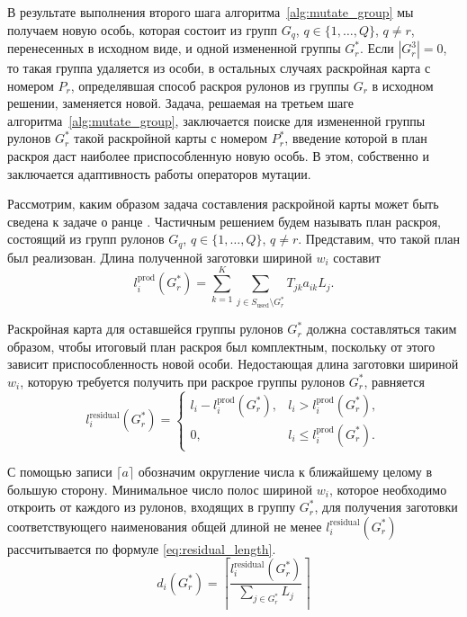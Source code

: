 \documentclass[12pt]{article}
\begin{document}
В результате выполнения второго шага алгоритма~\ref{alg:mutate_group} 
мы получаем новую 
особь, которая состоит из групп $G_q$, $q \in \{1,\ldots,Q\}$, $q \neq r$, 
перенесенных в исходном виде, и одной измененной группы $G_r^*$. Если 
$|G_r^3|=0$, то такая группа удаляется из особи, в остальных случаях 
раскройная карта с номером $P_r$, определявшая способ раскроя рулонов из 
группы $G_r$ в исходном решении, заменяется новой. Задача, решаемая на третьем 
шаге алгоритма~\ref{alg:mutate_group}, заключается поиске для измененной 
группы рулонов $G_r^*$ такой 
раскройной карты с номером $P_r^*$, введение которой в план раскроя даст 
наиболее приспособленную новую особь. В этом, собственно и заключается 
адаптивность работы операторов мутации.

Рассмотрим, каким образом задача составления раскройной карты может быть 
сведена к задаче о ранце 
\cite{martello90}. 
Частичным решением будем называть план 
раскроя, состоящий из групп рулонов $G_q$, $q \in \{1,\ldots,Q\}$, $q \neq r$. 
Представим, что такой план был реализован. Длина полученной заготовки шириной 
$w_i$ составит
\[ l_{i}^{\text{prod}}(G_r^*)=\sum_{k=1}^{K} \sum_{j \in S_{\text{used}} \setminus G_r^*} T_{jk} a_{ik} L_j. \]

Раскройная карта для оставшейся группы рулонов $G_r^*$ должна составляться 
таким образом, чтобы итоговый план раскроя был комплектным, поскольку от этого 
зависит приспособленность новой особи. Недостающая длина заготовки шириной 
$w_i$, которую требуется получить при раскрое группы рулонов $G_r^*$, равняется
\[ l_{i}^{\text{residual}}(G_r^*)=
    \begin{cases}
        l_i-l_{i}^{\text{prod}}(G_r^*), & l_i > l_{i}^{\text{prod}}(G_r^*), \\
        0, & l_i \leq l_{i}^{\text{prod}}(G_r^*).
    \end{cases} \]

С помощью записи $\lceil a \rceil$ обозначим округление числа к ближайшему 
целому в большую сторону. Минимальное число полос шириной $w_i$, которое 
необходимо откроить от каждого из рулонов, входящих в группу $G_r^*$, для 
получения заготовки соответствующего наименования общей длиной не менее 
$l_{i}^{\text{residual}}(G_r^*)$ рассчитывается по формуле 
\eqref{eq:residual_length}.
\begin{equation}\label{eq:residual_length}
d_i(G_r^*)=\left\lceil \frac{l_{i}^{\text{residual}}(G_r^*)}
                            {\sum_{j \in G_r^*} L_j} \right\rceil    
\end{equation}
    
\end{document}
